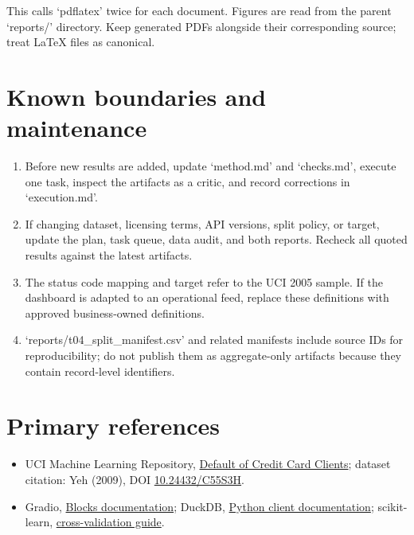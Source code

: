 \documentclass[11pt,letterpaper]{article}
\begin{document}
This calls `pdflatex' twice for each document. Figures are read from the parent `reports/' directory. Keep generated PDFs alongside their corresponding source; treat LaTeX files as canonical.

\section{Known boundaries and maintenance}
\begin{enumerate}
  \item Before new results are added, update `method.md' and `checks.md', execute one task, inspect the artifacts as a critic, and record corrections in `execution.md'.
  \item If changing dataset, licensing terms, API versions, split policy, or target, update the plan, task queue, data audit, and both reports. Recheck all quoted results against the latest artifacts.
  \item The status code mapping and target refer to the UCI 2005 sample. If the dashboard is adapted to an operational feed, replace these definitions with approved business-owned definitions.
  \item `reports/t04\_split\_manifest.csv' and related manifests include source IDs for reproducibility; do not publish them as aggregate-only artifacts because they contain record-level identifiers.
\end{enumerate}

\section{Primary references}
\begin{itemize}
  \item UCI Machine Learning Repository, \href{https://archive.ics.uci.edu/dataset/350/default+of+credit+card+clients}{Default of Credit Card Clients}; dataset citation: Yeh (2009), DOI \href{https://doi.org/10.24432/C55S3H}{10.24432/C55S3H}.
  \item Gradio, \href{https://www.gradio.app/docs/gradio/blocks}{Blocks documentation}; DuckDB, \href{https://duckdb.org/docs/stable/clients/python/overview}{Python client documentation}; scikit-learn, \href{https://scikit-learn.org/stable/modules/cross_validation.html}{cross-validation guide}.
\end{itemize}
\end{document}
